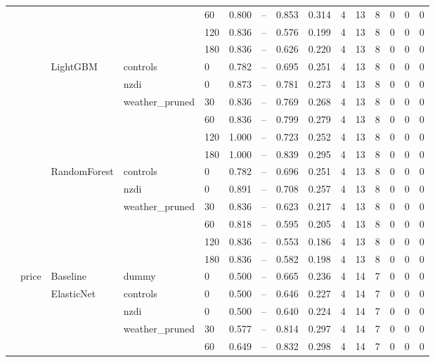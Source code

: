 \begin{longtable}{lllllrrrrrrrrrr}
 &  &  &  & 60 & 0.800 & -- & 0.853 & 0.314 & 4 & 13 & 8 & 0 & 0 & 0 \\
 &  &  &  & 120 & 0.836 & -- & 0.576 & 0.199 & 4 & 13 & 8 & 0 & 0 & 0 \\
 &  &  &  & 180 & 0.836 & -- & 0.626 & 0.220 & 4 & 13 & 8 & 0 & 0 & 0 \\
\cline{3-15} \cline{4-15}
 &  & \multirow[t]{6}{*}{LightGBM} & controls & 0 & 0.782 & -- & 0.695 & 0.251 & 4 & 13 & 8 & 0 & 0 & 0 \\
\cline{4-15}
 &  &  & nzdi & 0 & 0.873 & -- & 0.781 & 0.273 & 4 & 13 & 8 & 0 & 0 & 0 \\
\cline{4-15}
 &  &  & \multirow[t]{4}{*}{weather_pruned} & 30 & 0.836 & -- & 0.769 & 0.268 & 4 & 13 & 8 & 0 & 0 & 0 \\
 &  &  &  & 60 & 0.836 & -- & 0.799 & 0.279 & 4 & 13 & 8 & 0 & 0 & 0 \\
 &  &  &  & 120 & 1.000 & -- & 0.723 & 0.252 & 4 & 13 & 8 & 0 & 0 & 0 \\
 &  &  &  & 180 & 1.000 & -- & 0.839 & 0.295 & 4 & 13 & 8 & 0 & 0 & 0 \\
\cline{3-15} \cline{4-15}
 &  & \multirow[t]{6}{*}{RandomForest} & controls & 0 & 0.782 & -- & 0.696 & 0.251 & 4 & 13 & 8 & 0 & 0 & 0 \\
\cline{4-15}
 &  &  & nzdi & 0 & 0.891 & -- & 0.708 & 0.257 & 4 & 13 & 8 & 0 & 0 & 0 \\
\cline{4-15}
 &  &  & \multirow[t]{4}{*}{weather_pruned} & 30 & 0.836 & -- & 0.623 & 0.217 & 4 & 13 & 8 & 0 & 0 & 0 \\
 &  &  &  & 60 & 0.818 & -- & 0.595 & 0.205 & 4 & 13 & 8 & 0 & 0 & 0 \\
 &  &  &  & 120 & 0.836 & -- & 0.553 & 0.186 & 4 & 13 & 8 & 0 & 0 & 0 \\
 &  &  &  & 180 & 0.836 & -- & 0.582 & 0.198 & 4 & 13 & 8 & 0 & 0 & 0 \\
\cline{2-15} \cline{3-15} \cline{4-15}
 & \multirow[t]{31}{*}{price} & Baseline & dummy & 0 & 0.500 & -- & 0.665 & 0.236 & 4 & 14 & 7 & 0 & 0 & 0 \\
\cline{3-15} \cline{4-15}
 &  & \multirow[t]{6}{*}{ElasticNet} & controls & 0 & 0.500 & -- & 0.646 & 0.227 & 4 & 14 & 7 & 0 & 0 & 0 \\
\cline{4-15}
 &  &  & nzdi & 0 & 0.500 & -- & 0.640 & 0.224 & 4 & 14 & 7 & 0 & 0 & 0 \\
\cline{4-15}
 &  &  & \multirow[t]{4}{*}{weather_pruned} & 30 & 0.577 & -- & 0.814 & 0.297 & 4 & 14 & 7 & 0 & 0 & 0 \\
 &  &  &  & 60 & 0.649 & -- & 0.832 & 0.298 & 4 & 14 & 7 & 0 & 0 & 0 \\

\end{longtable}
